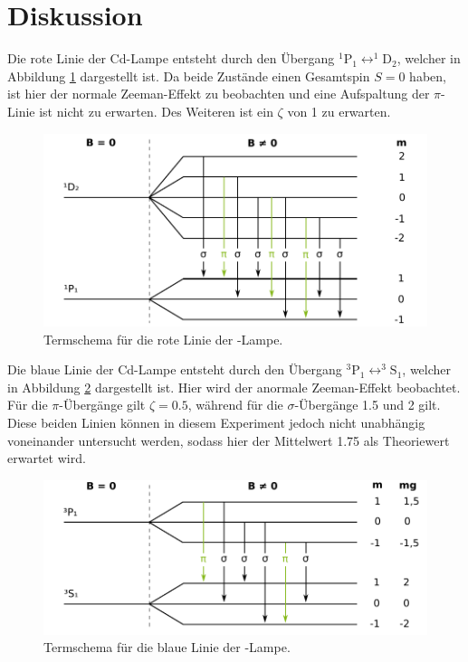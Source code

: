 \section{Diskussion}
\label{sec:Diskussion}

Die rote Linie der Cd-Lampe entsteht durch den Übergang
$^1\mathrm{P}_1 \leftrightarrow ^1\mathrm{D}_2$,
welcher in Abbildung \ref{fig:termschema-rot} dargestellt ist.
Da beide Zustände einen Gesamtspin $S = \num{0}$ haben, ist hier
der normale Zeeman-Effekt zu beobachten und eine Aufspaltung der
$\pi$-Linie ist nicht zu erwarten.
Des Weiteren ist ein $\zeta$ von \num{1} zu erwarten.
\begin{figure}
	\centering
	\includegraphics{images/termschema-rot.pdf}
	\caption{Termschema für die rote Linie der -Lampe.}
	\label{fig:termschema-rot}
\end{figure}

Die blaue Linie der Cd-Lampe entsteht durch den Übergang
$^3\mathrm{P}_1 \leftrightarrow ^3\mathrm{S}_1$,
welcher in Abbildung \ref{fig:termschema-blau} dargestellt
ist. Hier wird der anormale Zeeman-Effekt beobachtet.
Für die $\pi$-Übergänge gilt $\zeta = \num{0.5}$, während
für die $\sigma$-Übergänge \num{1.5} und \num{2} gilt.
Diese beiden Linien können in diesem Experiment jedoch nicht
unabhängig voneinander untersucht werden, sodass hier der
Mittelwert \num{1.75} als Theoriewert erwartet wird.
\begin{figure}
  \centering
  \includegraphics{images/termschema-blau.pdf}
  \caption{Termschema für die blaue Linie der -Lampe.}
  \label{fig:termschema-blau}
\end{figure}

